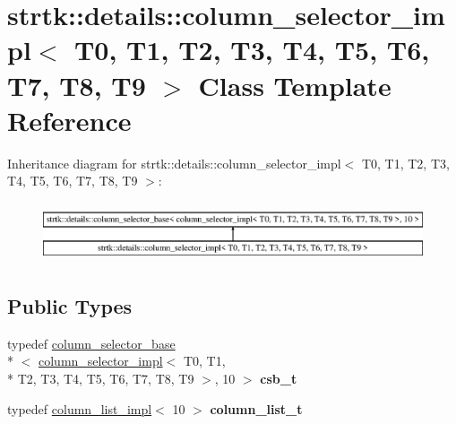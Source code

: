 \hypertarget{classstrtk_1_1details_1_1column__selector__impl_3_01T0_00_01T1_00_01T2_00_01T3_00_01T4_00_01T5_043b13d3d6fe5ff73160afdc979d62aa7}{\section{strtk\-:\-:details\-:\-:column\-\_\-selector\-\_\-impl$<$ T0, T1, T2, T3, T4, T5, T6, T7, T8, T9 $>$ Class Template Reference}
\label{classstrtk_1_1details_1_1column__selector__impl_3_01T0_00_01T1_00_01T2_00_01T3_00_01T4_00_01T5_043b13d3d6fe5ff73160afdc979d62aa7}
}
Inheritance diagram for strtk\-:\-:details\-:\-:column\-\_\-selector\-\_\-impl$<$ T0, T1, T2, T3, T4, T5, T6, T7, T8, T9 $>$\-:\begin{figure}[H]
\begin{center}
\leavevmode
\includegraphics[height=1.777778cm]{classstrtk_1_1details_1_1column__selector__impl_3_01T0_00_01T1_00_01T2_00_01T3_00_01T4_00_01T5_043b13d3d6fe5ff73160afdc979d62aa7}
\end{center}
\end{figure}
\subsection*{Public Types}
\begin{DoxyCompactItemize}
\item 
\hypertarget{classstrtk_1_1details_1_1column__selector__impl_3_01T0_00_01T1_00_01T2_00_01T3_00_01T4_00_01T5_043b13d3d6fe5ff73160afdc979d62aa7_ab24c850f36ea332c2a040f9c60a4d6ae}{typedef \hyperlink{classstrtk_1_1details_1_1column__selector__base}{column\-\_\-selector\-\_\-base}\\*
$<$ \hyperlink{classstrtk_1_1details_1_1column__selector__impl}{column\-\_\-selector\-\_\-impl}$<$ T0, T1, \\*
T2, T3, T4, T5, T6, T7, T8, T9 $>$, 10 $>$ {\bfseries csb\-\_\-t}}\label{classstrtk_1_1details_1_1column__selector__impl_3_01T0_00_01T1_00_01T2_00_01T3_00_01T4_00_01T5_043b13d3d6fe5ff73160afdc979d62aa7_ab24c850f36ea332c2a040f9c60a4d6ae}

\item 
\hypertarget{classstrtk_1_1details_1_1column__selector__impl_3_01T0_00_01T1_00_01T2_00_01T3_00_01T4_00_01T5_043b13d3d6fe5ff73160afdc979d62aa7_a6bd359b0ec12eb422bce47ef309cb8c1}{typedef \hyperlink{structstrtk_1_1details_1_1column__list__impl}{column\-\_\-list\-\_\-impl}$<$ 10 $>$ {\bfseries column\-\_\-list\-\_\-t}}\label{classstrtk_1_1details_1_1column__selector__impl_3_01T0_00_01T1_00_01T2_00_01T3_00_01T4_00_01T5_043b13d3d6fe5ff73160afdc979d62aa7_a6bd359b0ec12eb422bce47ef309cb8c1}

\end{DoxyCompactItemize}
